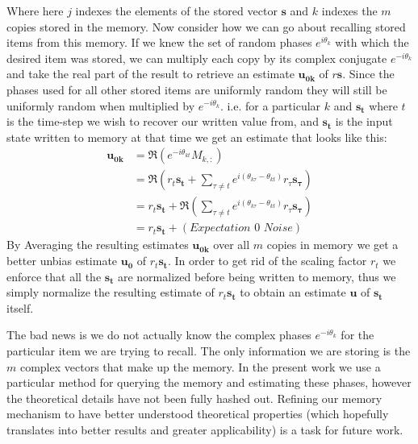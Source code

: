 \documentclass{article}
\begin{document}
Where here $j$ indexes the elements of the stored vector $\pmb{s}$ and $k$ indexes the $m$ copies stored in the memory. Now consider how we can go about recalling stored items from this memory. If we knew the set of random phases $e^{i\theta_k}$ with which the desired item was stored, we can multiply each copy by its complex conjugate $e^{-i\theta_k}$ and take the real part of the result to retrieve an estimate $\pmb{u_{0k}}$ of $r\pmb{s}$. Since the phases used for all other stored items are uniformly random they will still be uniformly random when multiplied by $e^{-i\theta_k}$. i.e. for a particular $k$ and $\pmb{s_t}$ where $t$ is the time-step we wish to recover our written value from, and $\pmb{s_t}$ is the input state written to memory at that time we get an estimate that looks like this:
\begin{align*}
\pmb{u_{0k}}&=\Re(e^{-i\theta_{kt}}M_{k,:})\\
&=\Re(r_t\pmb{s_t}+\sum_{\tau\neq t}e^{i(\theta_{k\tau}-\theta_{kt})}r_\tau\pmb{s_\tau})\\
&=r_t\pmb{s_t}+\Re(\sum_{\tau\neq t}e^{i(\theta_{k\tau}-\theta_{kt})}r_\tau\pmb{s_\tau})\\
&=r_t\pmb{s_t}+(\textit{Expectation 0 Noise})
\end{align*}
By Averaging the resulting estimates $\pmb{u_{0k}}$ over all $m$ copies in memory we get a better unbias estimate $\pmb{u_0}$ of $r_t\pmb{s_t}$. In order to get rid of the scaling factor $r_t$ we enforce that all the $\pmb{s_t}$ are normalized before being written to memory, thus we simply normalize the resulting estimate of $r_t\pmb{s_t}$ to obtain an estimate $\pmb{u}$ of $\pmb{s_t}$ itself.

The bad news is we do not actually know the complex phases $e^{-i\theta_k}$ for the particular item we are trying to recall. The only information we are storing is the $m$ complex vectors that make up the memory. In the present work we use a particular method for querying the memory and estimating these phases, however the theoretical details have not been fully hashed out. Refining our memory mechanism to have better understood theoretical properties (which hopefully translates into better results and greater applicability) is a task for future work.
\end{document}

